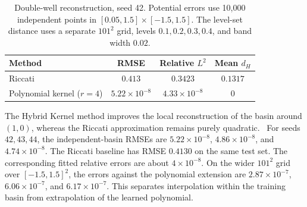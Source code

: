 \documentclass[11pt]{article}
\theoremstyle{plain}      %
\theoremstyle{definition} %
\providecommand{\DIFaddtex}[1]{{\protect\color{blue}#1}} %
\providecommand{\DIFdeltex}[1]{{\protect\color{red}#1}} %
\providecommand{\DIFaddbegin}{} %
\providecommand{\DIFaddend}{} %
\providecommand{\DIFdelbegin}{} %
\providecommand{\DIFdelend}{} %
\providecommand{\DIFadd}[1]{\texorpdfstring{\DIFaddtex{#1}}{#1}} %
\providecommand{\DIFdel}[1]{\texorpdfstring{\DIFdeltex{#1}}{}} %
\newcommand{\DIFscaledelfig}{1.0}
\newlength{\DIFdelgraphicswidth} %
\newlength{\DIFdelgraphicsheight} %
\newcommand{\DIFaddincludegraphics}[2][]{{\color{blue}\fbox{\DIFOincludegraphics[#1]{#2}}}} %
\newcommand{\DIFdelincludegraphics}[2][]{%
\sbox{\DIFdelgraphicsbox}{\DIFOincludegraphics[#1]{#2}}%
\settoboxwidth{\DIFdelgraphicswidth}{\DIFdelgraphicsbox} %
\settoboxtotalheight{\DIFdelgraphicsheight}{\DIFdelgraphicsbox} %
\scalebox{\DIFscaledelfig}{%
\parbox[b]{\DIFdelgraphicswidth}{\usebox{\DIFdelgraphicsbox}\\[-\baselineskip] \rule{\DIFdelgraphicswidth}{0em}}\llap{\resizebox{\DIFdelgraphicswidth}{\DIFdelgraphicsheight}{%
\setlength{\unitlength}{\DIFdelgraphicswidth}%
\begin{picture}(1,1)%
\thicklines\linethickness{2pt} %
{\color[rgb]{1,0,0}\put(0,0){\framebox(1,1){}}}%
{\color[rgb]{1,0,0}\put(0,0){\line( 1,1){1}}}%
{\color[rgb]{1,0,0}\put(0,1){\line(1,-1){1}}}%
\end{picture}%
}\hspace*{3pt}}} %
} %
\DeclareRobustCommand{\DIFaddbegin}{\DIFOaddbegin \let\includegraphics\DIFaddincludegraphics} %
\DeclareRobustCommand{\DIFaddend}{\DIFOaddend \let\includegraphics\DIFOincludegraphics} %
\DeclareRobustCommand{\DIFdelbegin}{\DIFOdelbegin \let\includegraphics\DIFdelincludegraphics} %
\DeclareRobustCommand{\DIFdelend}{\DIFOaddend \let\includegraphics\DIFOincludegraphics} %
\begin{document}
\begin{table}[htbp]\color{red}
    \centering
    \caption{Error metrics for Example~2 (double-well system) comparing the
    local Riccati approximation and the Hybrid Kernel surrogate, evaluated on a
    uniform grid in $[-1.5,1.5]^2$ and restricted to the basin of the stable
    equilibrium $(1,0)$.}
    \label{old:tab:example2_errors}
    \vspace{0.3em}
\end{table}
\begin{table}[htbp]\color{blue}\centering
\caption{Double-well reconstruction, seed 42. Potential errors use 10,000 independent points in $[0.05,1.5]\times[-1.5,1.5]$. The level-set distance uses a separate $101^2$ grid, levels $0.1,0.2,0.3,0.4$, and band width $0.02$.}\label{tab:example2_errors}
\begin{tabular}{lccc}\toprule Method & RMSE & Relative $L^2$ & Mean $d_H$\\\midrule
Riccati & $0.413$ & $0.3423$ & $0.1317$ \\
Polynomial kernel ($r=4$) & $5.22\times10^{-8}$ & $4.33\times10^{-8}$ & $0$ \\\bottomrule\end{tabular}\end{table}



\DIFdelbegin \DIFdel{The Hybrid Kernel
method improves the local reconstruction of the basin around $(1,0)$, whereas
the Riccati approximation remains purely quadratic. }\DIFdelend\ \DIFaddbegin \DIFadd{For seeds $42,43,44$, the independent-basin RMSEs are $5.22\times10^{-8}$, $4.86\times10^{-8}$, and $4.74\times10^{-8}$. The Riccati baseline has RMSE $0.4130$ on the same test set. The corresponding fitted relative errors are about $4\times10^{-8}$. On the wider $101^2$ grid over $[-1.5,1.5]^2$, the errors against the polynomial extension are $2.87\times10^{-7}$, $6.06\times10^{-7}$, and $6.17\times10^{-7}$. This separates interpolation within the training basin from extrapolation of the learned polynomial.
}\DIFaddend 
\end{document}
